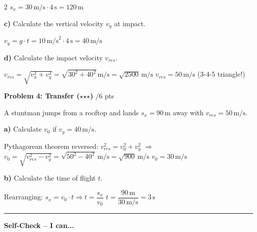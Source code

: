 \documentclass[10pt, a4paper]{article}
\newcommand{\fachfarbe}{physik}
\newcommand{\stmark}{$\star$}
\newcommand{\abschnitt}[1]{%
    \vspace{8pt}
    \noindent\textbf{\textcolor{\fachfarbe}{#1}}
    \vspace{4pt}
}
\newcommand{\punkte}[1]{\hfill\small\textcolor{grau}{/#1 pts}}
\begin{document}
\begin{multicols}{2}
\textcolor{loesung}{$s_x = 30\,\text{m/s} \cdot 4\,\text{s} = \boxed{120\,\text{m}}$}

\vspace{2pt}

\textbf{c)} Calculate the vertical velocity $v_y$ at impact.

\textcolor{loesung}{$v_y = g \cdot t = 10\,\text{m/s}^2 \cdot 4\,\text{s} = \boxed{40\,\text{m/s}}$}

\vspace{2pt}

\textbf{d)} Calculate the impact velocity $v_{res}$.

\textcolor{loesung}{$v_{res} = \sqrt{v_x^2 + v_y^2} = \sqrt{30^2 + 40^2}\,\text{m/s} = \sqrt{2500}\,\text{m/s}$ \quad $\boxed{v_{res} = 50\,\text{m/s}}$ (3-4-5 triangle!)}

\vspace{4pt}


\abschnitt{Problem 4: Transfer (\stmark\stmark\stmark)}\punkte{6}

A stuntman jumps from a rooftop and lands $s_x = 90\,\text{m}$ away with $v_{res} = 50\,\text{m/s}$.

\textbf{a)} Calculate $v_0$ if $v_y = 40\,\text{m/s}$.

\textcolor{loesung}{Pythagorean theorem reversed: $v_{res}^2 = v_0^2 + v_y^2$ $\Rightarrow$ $v_0 = \sqrt{v_{res}^2 - v_y^2} = \sqrt{50^2 - 40^2}\,\text{m/s} = \sqrt{900}\,\text{m/s}$ \quad $\boxed{v_0 = 30\,\text{m/s}}$}

\vspace{2pt}

\textbf{b)} Calculate the time of flight $t$.

\textcolor{loesung}{Rearranging: $s_x = v_0 \cdot t \Rightarrow t = \dfrac{s_x}{v_0}$ \quad $t = \dfrac{90\,\text{m}}{30\,\text{m/s}} = \boxed{3\,\text{s}}$}

\end{multicols}


\vspace{4pt}
\hrule
\vspace{6pt}

\small
\textbf{Self-Check -- I can...}
\end{document}

